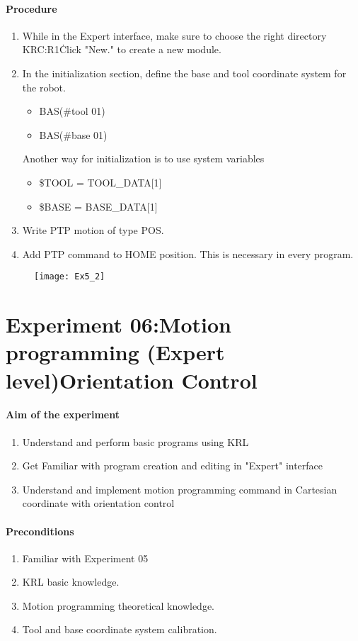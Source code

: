 \paragraph{Procedure}
\begin{enumerate}
	\item While in the Expert interface, make sure to choose the right directory KRC:R1\.Click "New." to create a new module.
	\item In the initialization section, define the base and tool coordinate system for the robot.
	\begin{itemize}
	\item BAS(\#tool 01)
	\item BAS(\#base 01)
\end{itemize}
Another way for initialization is to use system variables
\begin{itemize} 
	\item \$TOOL = TOOL\_DATA[1]
	\item \$BASE = BASE\_DATA[1]
\end{itemize}
\item Write PTP motion of type POS.
\item Add PTP command to HOME position. This is necessary in every program.
\end{enumerate}
\begin{figure}[H]
	\centering
	\texttt{[image: Ex5\_2]}
\end{figure}
\section{Experiment 06:Motion programming (Expert level)Orientation Control}
\paragraph{Aim of the experiment}
\begin{enumerate}
	\item  Understand and perform basic programs using KRL
	\item  Get Familiar with program creation and editing in "Expert" interface
	\item  Understand and implement motion programming command in Cartesian coordinate with orientation control
\end{enumerate}
\paragraph{Preconditions}
\begin{enumerate}
	\item  Familiar with Experiment 05
	\item  KRL basic knowledge.
	\item  Motion programming theoretical knowledge. 
	\item  Tool and base coordinate system calibration.
\end{enumerate}
